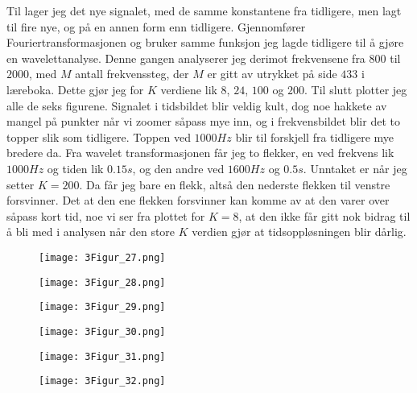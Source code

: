 \documentclass[11pt, A4paper,norsk]{article}
\begin{document}
				\begin{flushleft}
Til lager jeg det nye signalet, med de samme konstantene fra tidligere, men lagt til fire nye, og på en annen form enn tidligere. Gjennomfører Fouriertransformasjonen og bruker samme funksjon jeg lagde tidligere til å gjøre en wavelettanalyse. Denne gangen analyserer jeg derimot frekvensene fra $800$ til $2000$, med $M$ antall frekvenssteg, der $M$ er gitt av utrykket på side $433$ i læreboka. Dette gjør jeg for $K$ verdiene lik $8$, $24$, $100$ og $200$. Til slutt plotter jeg alle de seks figurene. Signalet i tidsbildet blir veldig kult, dog noe hakkete av mangel på punkter når vi zoomer såpass mye inn, og i frekvensbildet blir det to topper slik som tidligere. Toppen ved $1000 Hz$ blir til forskjell fra tidligere mye bredere da. Fra wavelet transformasjonen får jeg to flekker, en ved frekvens lik $1000 Hz$ og tiden lik $0.15 s$, og den andre ved $1600 Hz$ og $0.5 s$. Unntaket er når jeg setter $K = 200$. Da får jeg bare en flekk, altså den nederste flekken til venstre forsvinner. Det at den ene flekken forsvinner kan komme av at den varer over såpass kort tid, noe vi ser fra plottet for $K = 8$, at den ikke får gitt nok bidrag til å bli med i analysen når den store $K$ verdien gjør at tidsoppløsningen blir dårlig.
				\end{flushleft}
				\begin{figure}[H]
\texttt{[image: 3Figur\_27.png]}
				\end{figure}
				\begin{figure}[H]
\texttt{[image: 3Figur\_28.png]}
				\end{figure}
				\begin{figure}[H]
\texttt{[image: 3Figur\_29.png]}
				\end{figure}
				\begin{figure}[H]
\texttt{[image: 3Figur\_30.png]}
				\end{figure}
				\begin{figure}[H]
\texttt{[image: 3Figur\_31.png]}
				\end{figure}
				\begin{figure}[H]
\texttt{[image: 3Figur\_32.png]}
				\end{figure}

\end{document}
